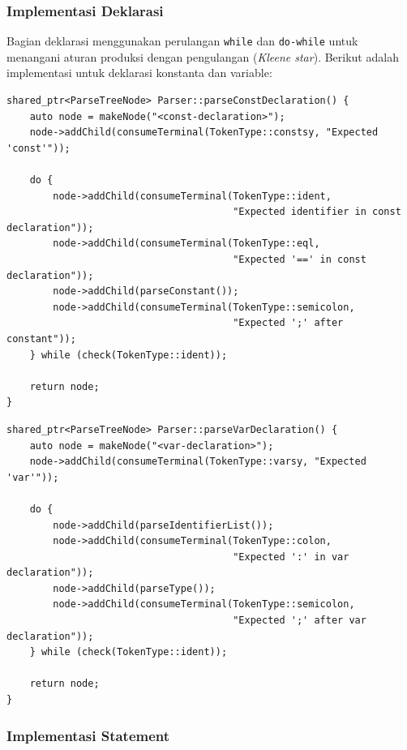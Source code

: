 ﻿\documentclass[12pt,a4paper]{article}
\begin{document}
\subsubsection{Implementasi Deklarasi}

Bagian deklarasi menggunakan perulangan \texttt{while} dan \texttt{do-while} untuk menangani aturan produksi dengan pengulangan (\textit{Kleene star}). Berikut adalah implementasi untuk deklarasi konstanta dan variable:

\begin{lstlisting}[style=cpp, caption={Implementasi deklarasi konstanta}]
shared_ptr<ParseTreeNode> Parser::parseConstDeclaration() {
    auto node = makeNode("<const-declaration>");
    node->addChild(consumeTerminal(TokenType::constsy, "Expected 'const'"));

    do {
        node->addChild(consumeTerminal(TokenType::ident,
                                       "Expected identifier in const declaration"));
        node->addChild(consumeTerminal(TokenType::eql,
                                       "Expected '==' in const declaration"));
        node->addChild(parseConstant());
        node->addChild(consumeTerminal(TokenType::semicolon,
                                       "Expected ';' after constant"));
    } while (check(TokenType::ident));

    return node;
}
\end{lstlisting}

\begin{lstlisting}[style=cpp, caption={Implementasi deklarasi variable}]
shared_ptr<ParseTreeNode> Parser::parseVarDeclaration() {
    auto node = makeNode("<var-declaration>");
    node->addChild(consumeTerminal(TokenType::varsy, "Expected 'var'"));

    do {
        node->addChild(parseIdentifierList());
        node->addChild(consumeTerminal(TokenType::colon,
                                       "Expected ':' in var declaration"));
        node->addChild(parseType());
        node->addChild(consumeTerminal(TokenType::semicolon,
                                       "Expected ';' after var declaration"));
    } while (check(TokenType::ident));

    return node;
}
\end{lstlisting}

\subsubsection{Implementasi Statement}
\end{document}
